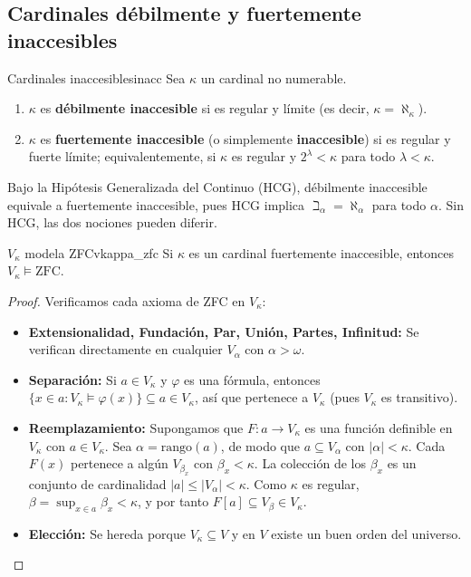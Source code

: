 \subsection{Cardinales débilmente y fuertemente inaccesibles}

\begin{definicion}{Cardinales inaccesibles}{inacc}
Sea $\kappa$ un cardinal no numerable.
\begin{enumerate}[leftmargin=2em, label=(\alph*)]
  \item $\kappa$ es \textbf{débilmente inaccesible} si es regular y límite (es decir, $\kappa = \aleph_\kappa$).
  \item $\kappa$ es \textbf{fuertemente inaccesible} (o simplemente \textbf{inaccesible}) si es regular y fuerte límite; equivalentemente, si $\kappa$ es regular y $2^\lambda < \kappa$ para todo $\lambda < \kappa$.
\end{enumerate}
\end{definicion}

\begin{importante}
Bajo la Hipótesis Generalizada del Continuo (HCG), débilmente inaccesible equivale a fuertemente inaccesible, pues HCG implica $\beth_\alpha = \aleph_\alpha$ para todo $\alpha$. Sin HCG, las dos nociones pueden diferir.
\end{importante}

\begin{teorema}{$V_\kappa$ modela ZFC}{vkappa_zfc}
Si $\kappa$ es un cardinal fuertemente inaccesible, entonces $V_\kappa \models \mathrm{ZFC}$.
\end{teorema}

\begin{proof}
Verificamos cada axioma de ZFC en $V_\kappa$:
\begin{itemize}[leftmargin=2em]
  \item \textbf{Extensionalidad, Fundación, Par, Unión, Partes, Infinitud:} Se verifican directamente en cualquier $V_\alpha$ con $\alpha > \omega$.
  \item \textbf{Separación:} Si $a \in V_\kappa$ y $\varphi$ es una fórmula, entonces $\{x \in a : V_\kappa \models \varphi(x)\} \subseteq a \in V_\kappa$, así que pertenece a $V_\kappa$ (pues $V_\kappa$ es transitivo).
  \item \textbf{Reemplazamiento:} Supongamos que $F: a \to V_\kappa$ es una función definible en $V_\kappa$ con $a \in V_\kappa$. Sea $\alpha = \mathrm{rango}(a)$, de modo que $a \subseteq V_\alpha$ con $|\alpha| < \kappa$. Cada $F(x)$ pertenece a algún $V_{\beta_x}$ con $\beta_x < \kappa$. La colección de los $\beta_x$ es un conjunto de cardinalidad $|a| \leq |V_\alpha| < \kappa$. Como $\kappa$ es regular, $\beta = \sup_{x \in a} \beta_x < \kappa$, y por tanto $F[a] \subseteq V_\beta \in V_\kappa$.
  \item \textbf{Elección:} Se hereda porque $V_\kappa \subseteq V$ y en $V$ existe un buen orden del universo.
\end{itemize}
\end{proof}

